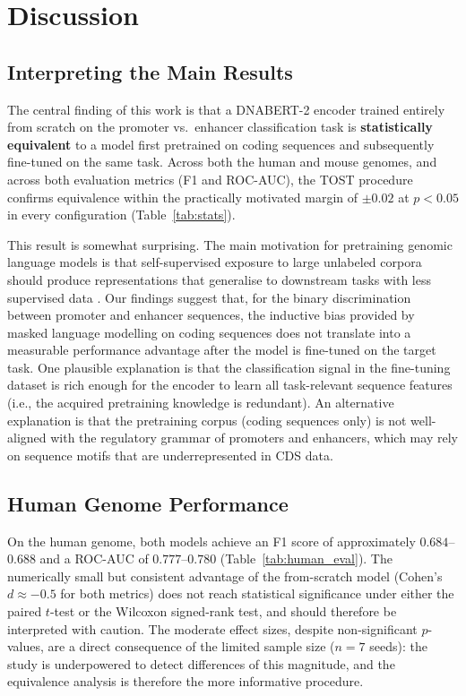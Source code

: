 \documentclass[11pt,a4paper,twoside]{article}
\begin{document}
\section{Discussion}
\label{sec:discussion}

\subsection{Interpreting the Main Results}

The central finding of this work is that a DNABERT-2 encoder trained entirely from scratch on the promoter vs.\ enhancer classification task is \textbf{statistically equivalent} to a model first pretrained on coding sequences and subsequently fine-tuned on the same task.
Across both the human and mouse genomes, and across both evaluation metrics (F1 and ROC-AUC), the TOST procedure confirms equivalence within the practically motivated margin of $\pm 0.02$ at $p < 0.05$ in every configuration (Table~\ref{tab:stats}).

This result is somewhat surprising.
The main motivation for pretraining genomic language models is that self-supervised exposure to large unlabeled corpora should produce representations that generalise to downstream tasks with less supervised data \cite{pretraining}.
Our findings suggest that, for the binary discrimination between promoter and enhancer sequences, the inductive bias provided by masked language modelling on coding sequences does not translate into a measurable performance advantage after the model is fine-tuned on the target task.
One plausible explanation is that the classification signal in the fine-tuning dataset is rich enough for the encoder to learn all task-relevant sequence features (i.e., the acquired pretraining knowledge is redundant).
An alternative explanation is that the pretraining corpus (coding sequences only) is not well-aligned with the regulatory grammar of promoters and enhancers, which may rely on sequence motifs that are underrepresented in CDS data.

\subsection{Human Genome Performance}

On the human genome, both models achieve an F1 score of approximately $0.684$--$0.688$ and a ROC-AUC of $0.777$--$0.780$ (Table~\ref{tab:human_eval}).
The numerically small but consistent advantage of the from-scratch model (Cohen's $d \approx -0.5$ for both metrics) does not reach statistical significance under either the paired $t$-test or the Wilcoxon signed-rank test, and should therefore be interpreted with caution.
The moderate effect sizes, despite non-significant $p$-values, are a direct consequence of the limited sample size ($n = 7$ seeds): the study is underpowered to detect differences of this magnitude, and the equivalence analysis is therefore the more informative procedure.
\end{document}
